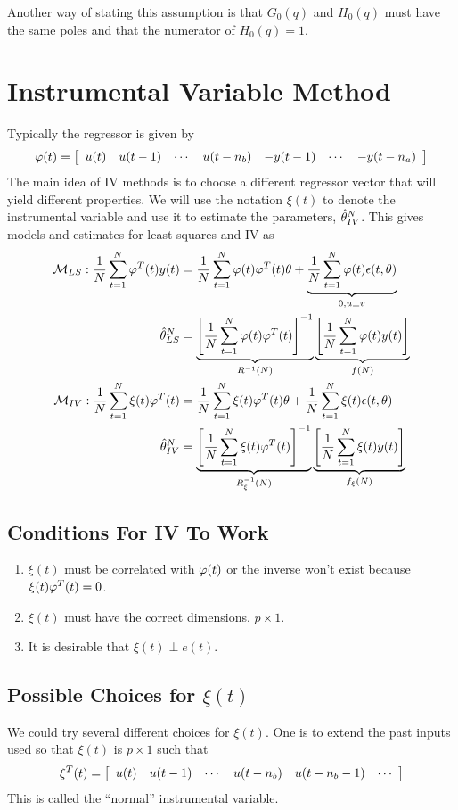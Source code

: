 Another way of stating this assumption is that $G_0(q)$ and $H_0(q)$ must have the same poles and that the numerator of $H_0(q)=1$.

\section{Instrumental Variable Method}
Typically the regressor is given by
$$\varphi(t) = \left[\begin{array}{c c c c c c c} u(t) & u(t-1) & \cdots & u(t-n_b) & -y(t-1) & \cdots & -y(t-n_a) \end{array}\right]$$
The main idea of IV methods is to choose a different regressor vector that will yield different properties. We will use the notation $\xi(t)$ to denote the instrumental variable and use it to estimate the parameters, $\hat{\theta}_{IV}^N$. This gives models and estimates for least squares and IV as
\begin{align*}
\mathcal{M}_{LS}: \frac{1}{N}\sum_{t=1}^N\varphi^T(t)y(t) &= \frac{1}{N}\sum_{t=1}^N\varphi(t)\varphi^T(t)\theta + \underbrace{\frac{1}{N}\sum_{t=1}^N\varphi(t)\epsilon(t,\theta)}_{0,u\perp v} \\
\hat{\theta}_{LS}^N &= \underbrace{\left[\frac{1}{N}\sum_{t=1}^N\varphi(t)\varphi^T(t)\right]^{-1}}_{R^{-1}(N)} \underbrace{\left[\frac{1}{N}\sum_{t=1}^N\varphi(t)y(t)\right]}_{f(N)} \\
\mathcal{M}_{IV}: \frac{1}{N}\sum_{t=1}^N\xi(t)\varphi^T(t) &= \frac{1}{N}\sum_{t=1}^N\xi(t)\varphi^T(t)\theta + \frac{1}{N}\sum_{t=1}^N\xi(t)\epsilon(t,\theta) \\
\hat{\theta}_{IV}^N &= \underbrace{\left[\frac{1}{N}\sum_{t=1}^N\xi(t)\varphi^T(t)\right]^{-1}}_{R_\xi^{-1}(N)} \underbrace{\left[\frac{1}{N}\sum_{t=1}^N\xi(t)y(t)\right]}_{f_\xi(N)}
\end{align*}

\subsection{Conditions For IV To Work}
\begin{enumerate}
\item $\xi(t)$ must be correlated with $\varphi(t)$ or the inverse won't exist because $\xi(t)\varphi^T(t) = 0$.
\item $\xi(t)$ must have the correct dimensions, $p\times 1$.
\item It is desirable that $\xi(t)\perp e(t)$.
\end{enumerate}

\subsection{Possible Choices for $\xi(t)$}
We could try several different choices for $\xi(t)$. One is to extend the past inputs used so that $\xi(t)$ is $p\times 1$ such that
$$\xi^T(t) = \left[\begin{array}{c c c c c c} u(t) & u(t-1) & \cdots & u(t-n_b) & u(t-n_b-1) & \cdots \end{array}\right]$$
This is called the ``normal'' instrumental variable.

